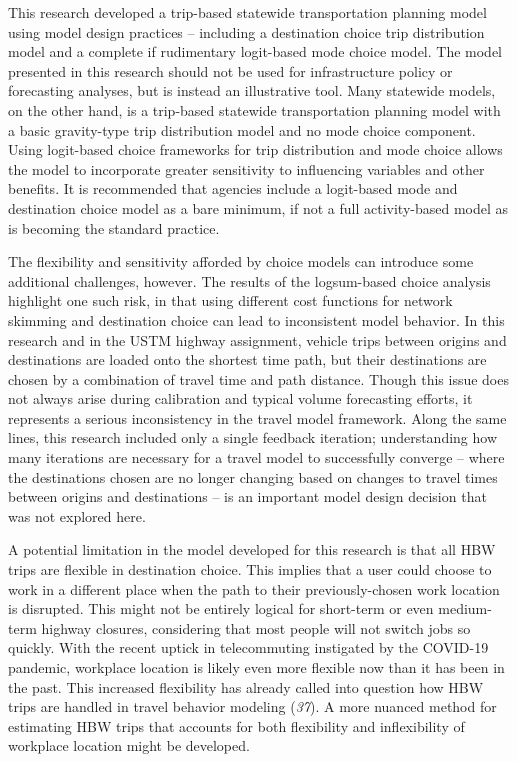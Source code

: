 \documentclass[
  letterpaper,
]{trb}
\begin{document}
This research developed a trip-based statewide transportation planning
model using model design practices -- including a destination choice
trip distribution model and a complete if rudimentary logit-based mode
choice model. The model presented in this research should not be used
for infrastructure policy or forecasting analyses, but is instead an
illustrative tool. Many statewide models, on the other hand, is a
trip-based statewide transportation planning model with a basic
gravity-type trip distribution model and no mode choice component. Using
logit-based choice frameworks for trip distribution and mode choice
allows the model to incorporate greater sensitivity to influencing
variables and other benefits. It is recommended that agencies include a
logit-based mode and destination choice model as a bare minimum, if not
a full activity-based model as is becoming the standard practice.

The flexibility and sensitivity afforded by choice models can introduce
some additional challenges, however. The results of the logsum-based
choice analysis highlight one such risk, in that using different cost
functions for network skimming and destination choice can lead to
inconsistent model behavior. In this research and in the USTM highway
assignment, vehicle trips between origins and destinations are loaded
onto the shortest time path, but their destinations are chosen by a
combination of travel time and path distance. Though this issue does not
always arise during calibration and typical volume forecasting efforts,
it represents a serious inconsistency in the travel model framework.
Along the same lines, this research included only a single feedback
iteration; understanding how many iterations are necessary for a travel
model to successfully converge -- where the destinations chosen are no
longer changing based on changes to travel times between origins and
destinations -- is an important model design decision that was not
explored here.

A potential limitation in the model developed for this research is that
all HBW trips are flexible in destination choice. This implies that a
user could choose to work in a different place when the path to their
previously-chosen work location is disrupted. This might not be entirely
logical for short-term or even medium-term highway closures, considering
that most people will not switch jobs so quickly. With the recent uptick
in telecommuting instigated by the COVID-19 pandemic, workplace location
is likely even more flexible now than it has been in the past. This
increased flexibility has already called into question how HBW trips are
handled in travel behavior modeling (\emph{37}). A more nuanced method
for estimating HBW trips that accounts for both flexibility and
inflexibility of workplace location might be developed.
\end{document}
